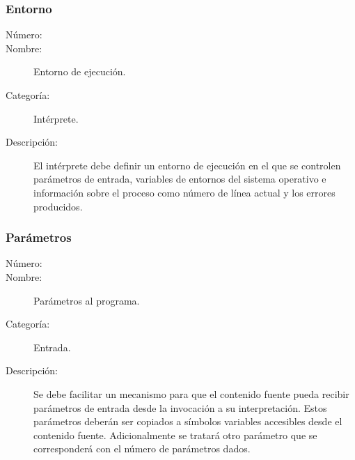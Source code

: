 \subsubsection{Entorno}
\begin{framed}
	\begin{description}
		\item [Número:] \cn
		\item [Nombre:] Entorno de ejecución.
		\item [Categoría:] Intérprete.
		\item [Descripción:] El intérprete debe definir un entorno de ejecución en
		el que se controlen parámetros de entrada, variables de entornos del sistema operativo e información sobre
		el proceso como número de línea actual y los errores producidos.
	\end {description}
\end{framed}

\subsubsection {Parámetros}
\begin{framed}
	\begin{description}
		\item [Número:] \cn
		\item [Nombre:] Parámetros al programa.
		\item [Categoría:] Entrada.
		\item [Descripción:] Se debe facilitar un mecanismo para que el contenido fuente pueda recibir parámetros de entrada desde la
		invocación a su interpretación. Estos parámetros deberán ser copiados a símbolos variables accesibles desde el contenido fuente. 
		Adicionalmente se tratará otro parámetro que se corresponderá con el número de parámetros dados.
	\end{description}
\end{framed}
